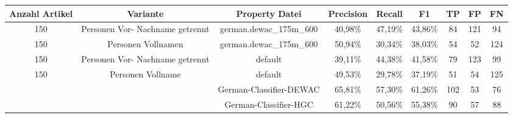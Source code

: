 \documentclass[a4paper]{article}
\begin{document}
\newpage

\begin{sidewaystable}
\label{Tabelle Ergebnisse}
\caption{Ergebnistabelle}
\begin{longtable}{|c|c|c|c|c|c|c|c|c|}
\hline 
Anzahl Artikel & Variante & Property Datei & Precision & Recall & F1 & TP & FP & FN \\ 
\hline 
150 & Personen Vor- Nachname getrennt & german.dewac\_175m\_600 & 40,98\% & 47,19\% & 43,86\% & 84 & 121 & 94 \\ 
\hline 
150 & Personen Vollnamen & german.dewac\_175m\_600 & 50,94\% & 30,34\% & 38,03\% & 54 & 52 & 124 \\ 
\hline 
150 & Personen Vor- Nachname getrennt & default & 39,11\% & 44,38\% & 41,58\% &  79 & 123 & 99 \\ 
\hline 
150 & Personen Vollname & default & 49,53\% & 29,78\% & 37,19\% & 51 & 54 & 125 \\ 
\hline 
  &  & German-Classifier-DEWAC & 65,81\% & 57,30\% & 61,26\% & 102 & 53 & 76 \\ 
\hline 
  &  & German-Classifier-HGC & 61,22\% & 50,56\% & 55,38\% & 90 & 57 & 88 \\ 
\hline
\end{longtable} 
\end{sidewaystable}
\end{document}
